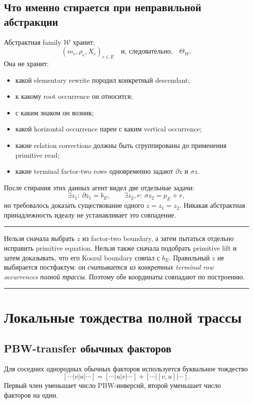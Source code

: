 \documentclass[11pt,a4paper]{article}
\theoremstyle{definition}
\theoremstyle{remark}
\newenvironment{dangerbox}{%
  \par\medskip\noindent
  \begin{center}\begin{minipage}{0.94\textwidth}
  \color{darkred}\hrule\vspace{0.55em}
}{%
  \vspace{0.35em}\hrule\end{minipage}\end{center}\medskip
}
\begin{document}
\subsection{Что именно стирается при неправильной абстракции}

Абстрактная family $\mathcal W$ хранит:
\[
 (m_e,\rho_e,X_e)_{e\in E}
 \quad\text{и, следовательно,}\quad
 \Theta_{\mathcal W}.
\]
Она не хранит:

\begin{itemize}
\item какой elementary rewrite породил конкретный descendant;
\item к какому root occurrence он относится;
\item с каким знаком он возник;
\item какой horizontal occurrence парен с каким vertical occurrence;
\item какие relation corrections должны быть сгруппированы до применения
primitive read;
\item какие terminal factor-two rows одновременно задают $\partial z$ и
$\sigma z$.
\end{itemize}

После стирания этих данных агент видел две отдельные задачи:
\[
 \exists z_1:\ \partial z_1=b_E,
 \qquad
 \exists z_2,r:\ \sigma z_2=p_E+r,
\]
но требовалось доказать существование одного $z=z_1=z_2$. Никакая
абстрактная принадлежность идеалу не устанавливает это совпадение.

\begin{dangerbox}
Нельзя сначала выбрать $z$ из factor-two boundary, а затем пытаться отдельно
исправить primitive equation. Нельзя также сначала подобрать primitive lift и
затем доказывать, что его Koszul boundary совпал с $b_E$. Правильный $z$
не выбирается постфактум: он \emph{считывается из конкретных terminal row
occurrences полной трассы}. Поэтому обе координаты совпадают по построению.
\end{dangerbox}

\section{Локальные тождества полной трассы}

\subsection{PBW-transfer обычных факторов}

Для соседних однородных обычных факторов используется буквальное тождество
\begin{equation}\label{eq:ordinary-transfer}
 [\cdots|v|u|\cdots]
 =
 [\cdots|u|v|\cdots]
 +[\cdots|[v,u]|\cdots].
\end{equation}
Первый член уменьшает число PBW-инверсий, второй уменьшает число факторов на
один.
\end{document}
